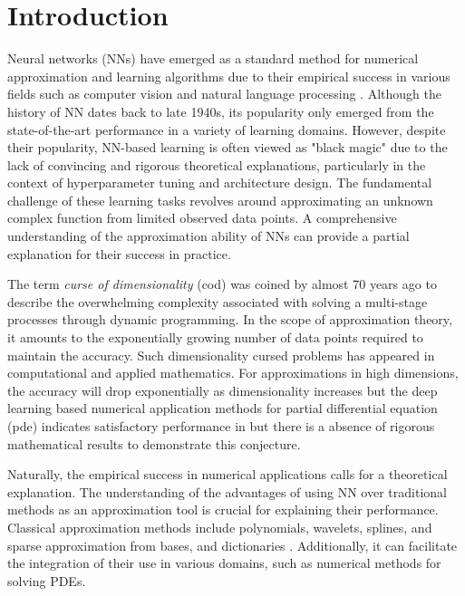 \chapter{Introduction}
\label{ch:introduction}


Neural networks (NNs) have emerged as a standard method for numerical
approximation and learning algorithms due to their empirical success in various
fields such as computer vision and natural language processing
\citep{shalev-shwartzUnderstandingMachineLearning2014}. Although the history of
NN dates back to late 1940s, its popularity only emerged from the
state-of-the-art performance in a variety of learning domains. However, despite
their popularity, NN-based learning is often viewed as "black magic" due to the
lack of convincing and rigorous theoretical explanations, particularly in the
context of hyperparameter tuning and architecture design. The fundamental
challenge of these learning tasks revolves around approximating an unknown
complex function from limited observed data points. A comprehensive
understanding of the approximation ability of NNs can provide a partial
explanation for their success in practice.


The term \textit{curse of dimensionality} (\gls{cod}) was coined by
\cite{bellmanTheoryDynamicProgramming1952} almost 70 years ago to describe the
overwhelming complexity associated with solving a multi-stage processes through
dynamic programming. In the scope of approximation theory, it amounts to the
exponentially growing number of data points required to maintain the accuracy.
Such dimensionality cursed problems has appeared in computational and applied
mathematics. For approximations in high dimensions, the accuracy will drop
exponentially as dimensionality increases but the deep learning based numerical
application methods for partial differential equation (\gls{pde}) indicates
satisfactory performance in \cite{eDeepRitzMethod2017,
eDeepLearningbasedNumerical2017,beckMachineLearningApproximation2019} but there
is a absence of rigorous mathematical results to demonstrate this conjecture.



Naturally, the empirical success in numerical applications calls for a
theoretical explanation. The understanding of the advantages of using NN over
traditional methods as an approximation tool is crucial for explaining their
performance. Classical approximation methods include polynomials, wavelets,
splines, and sparse approximation from bases, and dictionaries
\citep{devore_1998}. Additionally, it can facilitate the integration of their
use in various domains, such as numerical methods for solving PDEs.

